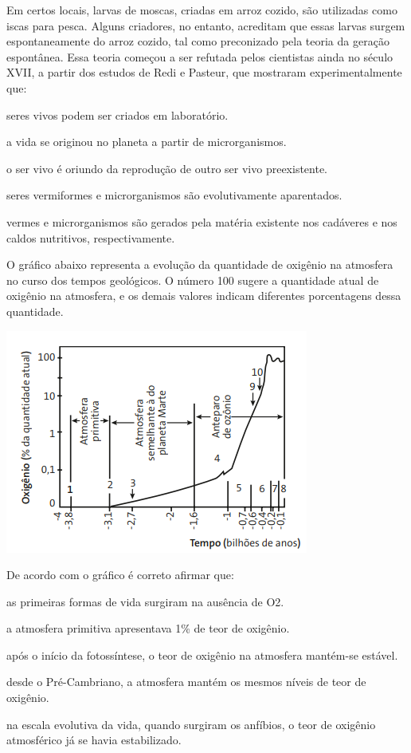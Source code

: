 \questao
Em certos locais, larvas de moscas, criadas em arroz cozido, são utilizadas como iscas para pesca. Alguns criadores, no entanto, acreditam que essas larvas surgem espontaneamente do arroz cozido, tal como preconizado pela teoria da geração espontânea. Essa teoria começou a ser refutada pelos cientistas ainda no século XVII, a partir dos estudos de Redi e Pasteur, que mostraram experimentalmente que:
\begin{alternativas}
\item seres vivos podem ser criados em laboratório. 
\item a vida se originou no planeta a partir de microrganismos. 
\item o ser vivo é oriundo da reprodução de outro ser vivo preexistente. 
\item seres vermiformes e microrganismos são evolutivamente aparentados. 
\item vermes e microrganismos são gerados pela matéria existente nos cadáveres e nos caldos nutritivos, respectivamente.
\end{alternativas}

\questao
O gráfico abaixo representa a evolução da quantidade de oxigênio na atmosfera no curso dos tempos geológicos. O número 100 sugere a quantidade atual de oxigênio na atmosfera, e os demais valores indicam diferentes porcentagens dessa quantidade.
\begin{center}
\includegraphics[width=\columnwidth]{subareas/ciencias_natureza/biologia-1.png}
\end{center}
De acordo com o gráfico é correto afirmar que:
\begin{alternativas}
\item as primeiras formas de vida surgiram na ausência de O2. 
\item a atmosfera primitiva apresentava 1\% de teor de oxigênio. 
\item após o início da fotossíntese, o teor de oxigênio na atmosfera mantém-se estável. 
\item desde o Pré-Cambriano, a atmosfera mantém os mesmos níveis de teor de oxigênio. 
\item na escala evolutiva da vida, quando surgiram os anfíbios, o teor de oxigênio atmosférico já se havia estabilizado.
\end{alternativas}


